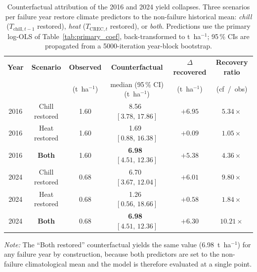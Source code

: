 \begin{table}[H]
\caption{Counterfactual attribution of the 2016 and 2024 yield collapses. Three scenarios per failure year restore climate predictors to the non-failure historical mean: \textit{chill} ($T_{\text{chill},t-1}$ restored), \textit{heat} ($T_{\text{CREC},t}$ restored), or \textit{both}. Predictions use the primary log-OLS of Table~\ref{tab:primary_coef}, back-transformed to t~ha$^{-1}$; 95\,\% CIs are propagated from a 5000-iteration year-block bootstrap.\label{tab:counterfactual}}
\centering
\small
\begin{tabular}{cccccc}
\toprule
\textbf{Year} & \textbf{Scenario} & \textbf{Observed} & \textbf{Counterfactual} & \textbf{$\Delta$ recovered} & \textbf{Recovery ratio} \\
              &                   & (t~ha$^{-1}$)     & median (95\,\% CI) (t~ha$^{-1}$) & (t~ha$^{-1}$) & (cf~/~obs) \\
\midrule
2016 & Chill restored      & 1.60 & 8.56 \,$[3.78,\,17.86]$ & $+6.95$ & $5.34\times$ \\
2016 & Heat restored       & 1.60 & 1.69 \,$[0.88,\,16.38]$ & $+0.09$ & $1.05\times$ \\
2016 & \textbf{Both}       & 1.60 & \textbf{6.98} \,$[4.51,\,12.36]$ & $+5.38$ & $4.36\times$ \\
\midrule
2024 & Chill restored      & 0.68 & 6.70 \,$[3.67,\,12.04]$ & $+6.01$ & $9.80\times$ \\
2024 & Heat restored       & 0.68 & 1.26 \,$[0.56,\,18.66]$ & $+0.58$ & $1.84\times$  \\
2024 & \textbf{Both}       & 0.68 & \textbf{6.98} \,$[4.51,\,12.36]$ & $+6.30$ & $10.21\times$ \\
\bottomrule
\end{tabular}

\vspace{2pt}
\footnotesize\noindent\textit{Note:} The ``Both restored'' counterfactual yields the same value (6.98~t~ha$^{-1}$) for any failure year by construction, because both predictors are set to the non-failure climatological mean and the model is therefore evaluated at a single point.
\end{table}
